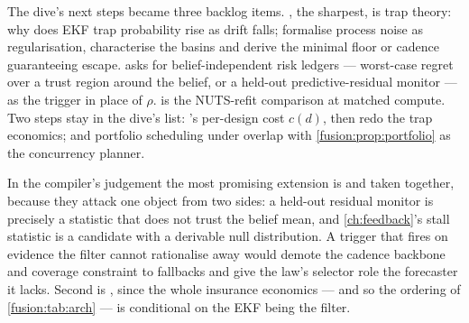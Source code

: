 The dive's next steps became three backlog items. , the sharpest, is trap theory: why does EKF trap probability rise as drift falls; formalise process noise as regularisation, characterise the basins and derive the minimal floor or cadence guaranteeing escape.  asks for belief-independent risk ledgers --- worst-case regret over a trust region around the belief, or a held-out predictive-residual monitor --- as the trigger in place of $\rho$.  is the NUTS-refit comparison at matched compute. Two steps stay in the dive's list: 's per-design cost $c(d)$, then redo the trap economics; and portfolio scheduling under overlap with \cref{fusion:prop:portfolio} as the concurrency planner.

In the compiler's judgement the most promising extension is  and  taken together, because they attack one object from two sides: a held-out residual monitor is precisely a statistic that does not trust the belief mean, and \cref{ch:feedback}'s stall statistic is a candidate with a derivable null distribution. A trigger that fires on evidence the filter cannot rationalise away would demote the cadence backbone and coverage constraint to fallbacks and give the law's selector role the forecaster it lacks. Second is , since the whole insurance economics --- and so the ordering of \cref{fusion:tab:arch} --- is conditional on the EKF being the filter.

